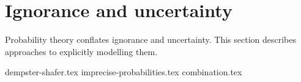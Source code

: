 \section{Ignorance and uncertainty}

Probability theory conflates ignorance and uncertainty.
This section describes approaches to explicitly modelling them.

{dempster-shafer.tex}
{imprecise-probabilities.tex}
{combination.tex}
